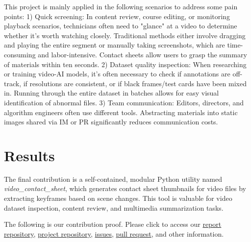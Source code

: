 \documentclass[12pt]{article}
\begin{document}
This project is mainly applied in the following scenarios to address some pain points: 1) Quick screening: In content review, course editing, or monitoring playback scenarios, technicians often need to "glance" at a video to determine whether it's worth watching closely. Traditional methods either involve dragging and playing the entire segment or manually taking screenshots, which are time-consuming and labor-intensive. Contact sheets allow users to grasp the summary of materials within ten seconds. 2) Dataset quality inspection: When researching or training video-AI models, it’s often necessary to check if annotations are off-track, if resolutions are consistent, or if black frames/test cards have been mixed in. Running through the entire dataset in batches allows for easy visual identification of abnormal files. 3) Team communication: Editors, directors, and algorithm engineers often use different tools. Abstracting materials into static images shared via IM or PR significantly reduces communication costs.



\section{Results}

The final contribution is a self-contained, modular Python utility named \textit{video\_contact\_sheet}, which generates contact sheet thumbnails for video files by extracting keyframes based on scene changes. This tool is valuable for video dataset inspection, content review, and multimedia summarization tasks.

The following is our contribution proof. Please click to access our \href{https://github.com/libran11/CPT304A2}{report repository},  \href{https://github.com/libran11/Python-Scripts}{project repository}, \href{https://github.com/DhanushNehru/Python-Scripts/issues/425}{issues}, \href{https://github.com/DhanushNehru/Python-Scripts/pull/426}{pull request}, and other information.
\end{document}
